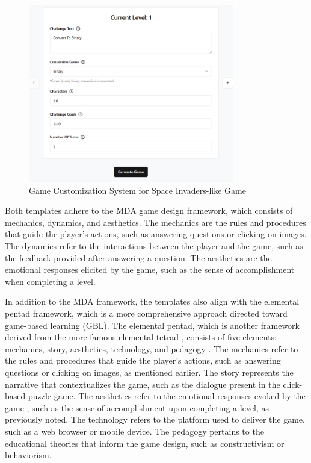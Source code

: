 \begin{figure}
	\centering
	\includegraphics[width=0.8\textwidth]{figures/Space_Invaders/Instructor_Portal_Space_Invader.png}
	\caption{Game Customization System for Space Invaders-like Game}
	\label{fig:customizationSpaceInvaders}
\end{figure}

Both templates adhere to the MDA \cite{MDA2004} game design framework, which consists of mechanics, dynamics, and aesthetics. The mechanics are the rules and procedures that guide the player's actions, such as answering questions or clicking on images. The dynamics refer to the interactions between the player and the game, such as the feedback provided after answering a question. The aesthetics are the emotional responses elicited by the game, such as the sense of accomplishment when completing a level.

In addition to the MDA framework, the templates also align with the elemental pentad framework, which is a more comprehensive approach directed toward game-based learning (GBL). The elemental pentad, which is another framework derived from the more famous elemental tetrad \cite{tetrad2011}, consists of five elements: mechanics, story, aesthetics, technology, and pedagogy \cite{ahmad2019}. The mechanics refer to the rules and procedures that guide the player's actions, such as answering questions or clicking on images, as mentioned earlier. The story represents the narrative that contextualizes the game, such as the dialogue present in the click-based puzzle game. The aesthetics refer to the emotional responses evoked by the game \cite{MDA2004}, such as the sense of accomplishment upon completing a level, as previously noted. The technology refers to the platform used to deliver the game, such as a web browser or mobile device. The pedagogy pertains to the educational theories that inform the game design, such as constructivism or behaviorism.

